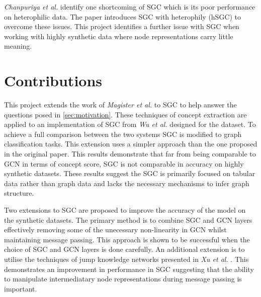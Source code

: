 


\textit{Chanpuriya et al.} \cite{chanpuriya2022simplified} identify one shortcoming of SGC which is its poor performance on heterophilic data.
The paper introduces SGC with heterophily (hSGC) to overcome these issues. 
This project identifies a further issue with SGC when working with highly synthetic data where node representations carry little meaning.


\section{Contributions}


This project extends the work of \textit{Magister et al.} \cite{magister2021gcexplainer} to SGC \cite{wu2019simplifying} to help answer the questions posed in \ref{sec:motivation}.
These techniques of concept extraction are applied to an implementation of SGC from \textit{Wu et al.} designed for the dataset.
To achieve a full comparison between the two systems SGC is modified to graph classification tasks. 
This extension uses a simpler approach than the one proposed in the original paper.
This results demonstrate that far from being comparable to GCN in terms of concept score, SGC is not comparable in accuracy on highly synthetic datasets.
These results suggest the SGC is primarily focused on tabular data rather than graph data and lacks the necessary mechanisms to infer graph structure.

Two extensions to SGC are proposed to improve the accuracy of the model on the synthetic datasets.
The primary method is to combine SGC and GCN layers effectively removing some of the unecessary non-linearity in GCN whilst maintaining message passing.
This approach is shown to be successful when the choice of SGC and GCN layers is done carefully.
An additional extension is to utilise the techniques of jump knowledge networks presented in \textit{Xu et al.} \cite{xu2018representation}.
This demonstrates an improvement in performance in SGC suggesting that the ability to manipulate intermediatary node representations during message passing is important.

